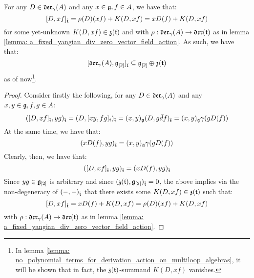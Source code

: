         \begin{lemma} \label{lemma: derivation_action_on_multiloop_algebras}
            For any $D \in \mathfrak{der}_{\gamma}(A)$ and any $x \in \mathfrak{g}, f \in A$, we have that:
                $$[D, xf]_{\hat{\mathfrak{t}}} = \rho(D)(xf) + K( D, xf ) = x D(f) + K( D, xf )$$
            for some yet-unknown $K( D, xf ) \in \mathfrak{z}(\mathfrak{t})$ and with $\rho: \mathfrak{der}_{\gamma}(A) \to \mathfrak{der}(\mathfrak{t})$ as in lemma \ref{lemma: a_fixed_yangian_div_zero_vector_field_action}. As such, we have that:
                $$[\mathfrak{der}_{\gamma}(A), \mathfrak{g}_{[2]}]_{\hat{\mathfrak{t}}} \subseteq \mathfrak{g}_{[2]} \oplus \mathfrak{z}(\mathfrak{t})$$
            as of now\footnote{In lemma \ref{lemma: no_polynomial_terms_for_derivation_action_on_multiloop_algebras}, it will be shown that in fact, the $\mathfrak{z}(\mathfrak{t})$-summand $K( D, xf )$ vanishes.}.
        \end{lemma}
            \begin{proof}
                Consider firstly the following, for any $D \in \mathfrak{der}_{\gamma}(A)$ and any $x, y \in \mathfrak{g}, f, g \in A$:
                    $$( [D, xf]_{\hat{\mathfrak{t}}}, yg )_{\hat{\mathfrak{t}}} = ( D, [xy, fg]_{\mathfrak{t}} )_{\hat{\mathfrak{t}}} = (x, y)_{\mathfrak{g}} ( D, g\bar{d}f )_{\hat{\mathfrak{t}}} = (x, y)_{\mathfrak{g}} \gamma( g D(f) )$$
                At the same time, we have that:
                    $$( x D(f), yg )_{\hat{\mathfrak{t}}} = (x, y)_{\mathfrak{g}} \gamma( g D(f) )$$
                Clearly, then, we have that:
                    $$( [D, xf]_{\hat{\mathfrak{t}}}, yg )_{\hat{\mathfrak{t}}} = ( x D(f), yg )_{\hat{\mathfrak{t}}}$$
                Since $yg \in \mathfrak{g}_{[2]}$ is arbitrary and since $(\mathfrak{z}(\mathfrak{t}), \mathfrak{g}_{[2]})_{\hat{\mathfrak{t}}} = 0$, the above implies via the non-degeneracy of $(-, -)_{\hat{\mathfrak{t}}}$ that there exists some $K(D, xf) \in \mathfrak{z}(\mathfrak{t})$ such that:
                    $$[D, xf]_{\hat{\mathfrak{t}}} = x D(f) + K(D, xf) = \rho(D)(xf) + K(D, xf)$$
                with $\rho: \mathfrak{der}_{\gamma}(A) \to \mathfrak{der}(\mathfrak{t})$ as in lemma \ref{lemma: a_fixed_yangian_div_zero_vector_field_action}.
            \end{proof}

